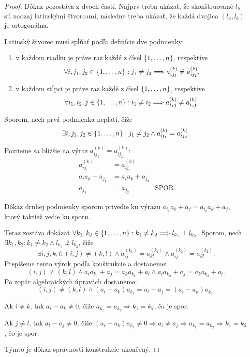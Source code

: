 \begin{proof}
Dôkaz pozostáva z dvoch častí.
Najprv treba ukázať, že skonštruované $l_k$ sú naozaj latinskými štvorcami, následne treba ukázať, že každá dvojica $(l_a, l_b)$ je ortogonálna.

Latinský štvorec musí spĺňať podľa definície dve podmienky:
\begin{enumerate}
    \item v každom riadku je práve raz každé z čísel $\left\{1, \ldots, n\right\}$, respektíve $$\forall i, j_1, j_2 \in \left\{1, \ldots, n\right\}: j_1 \neq j_2 \Longrightarrow a_{ij_1}^{(k)} \neq a_{ij_2}^{(k)},$$
    \item v každom stĺpci je práve raz každé z čísel $\left\{1, \ldots, n\right\}$, respektíve $$\forall i_1, i_2, j \in \left\{1, \ldots, n\right\}: i_1 \neq i_2 \Longrightarrow a_{i_1j}^{(k)} \neq a_{i_2j}^{(k)}.$$
\end{enumerate}

Sporom, nech prvá podmienka neplatí, čiže $$\exists i, j_1, j_2  \in \left\{1, \ldots, n\right\}: j_1 \neq j_2 \wedge a_{ij_1}^{(k)} = a_{ij_2}^{(k)}.$$

Pozrieme sa bližšie na výraz $a_{ij_1}^{(k)} = a_{ij_2}^{(k)}$:
\begin{align*}
a_{ij_1}^{(k)} &= a_{ij_2}^{(k)}\\
a_i a_{k} + a_{j_1} &= a_i a_{k} + a_{j_2}\\
a_{j_1} &= a_{j_2}&\text{SPOR}
\end{align*}

Dôkaz druhej podmienky sporom privedie ku výrazu $a_{i_1}a_k + a_j = a_{i_2}a_k + a_j$, ktorý taktiež vedie ku sporu.

Teraz zostáva dokázať $\forall k_1, k_2 \in \left\{1, \ldots, n\right\}: k_1 \neq k_2 \Longrightarrow l_{k_1} \perp l_{k_2}$.
Sporom, nech $\exists k_1, k_2: k_1 \neq k_2 \wedge l_{k_1} \not\perp l_{k_2}$, čiže $$\exists i, j, k, l: (i, j) \neq (k, l) \wedge a^{(k_1)}_{ij} = a^{(k_1)}_{kl} \wedge a^{(k_2)}_{ij} = a^{(k_2)}_{kl}.$$
Prepíšeme tento výrok podľa konštrukcie a dostaneme:
$$
(i, j) \neq (k, l) \wedge a_i a_{k_1} + a_j = a_k a_{k_1} + a_l \wedge a_i a_{k_2} + a_j = a_k a_{k_2} + a_l.
$$
Po zopár algebraických úpravách dostaneme:
$$
(i, j) \neq (k, l) \wedge (a_i - a_k) a_{k_1} = a_l - a_j = (a_i - a_k)a_{k_2}.
$$

Ak $i \neq k$, tak $a_i - a_k \neq 0$, čiže $a_{k_1} = a_{k_2} \Longrightarrow k_1 = k_2$, čo je spor.

Ak $j \neq l$, tak $a_l - a_j \neq 0$, čiže $(a_i - a_k) a_{k_1} \neq 0 \Longrightarrow a_i \neq a_j \Longrightarrow a_{k_1} = a_{k_2} \Longrightarrow k_1 = k_2$, čo je spor.

Týmto je dôkaz správnosti konštrukcie ukončený.

\end{proof}

